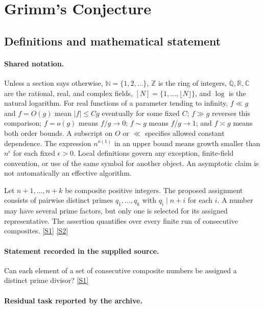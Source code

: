 \documentclass[11pt,a4paper]{article}
\newcommand{\N}{\mathbb{N}}
\newcommand{\Z}{\mathbb{Z}}
\newcommand{\Q}{\mathbb{Q}}
\newcommand{\R}{\mathbb{R}}
\newcommand{\C}{\mathbb{C}}
\newcommand{\sref}[2]{\hyperlink{source:#1:#2}{[S#2]}}
\begin{document}
\section{Grimm's Conjecture}\label{statement}


\subsection{Definitions and mathematical statement}

\paragraph{Shared notation.}Unless a section says otherwise, $\N=\{1,2,\ldots\}$,
$\Z$ is the ring of integers, $\Q,\R,\C$ are the rational, real, and complex
fields, $[N]=\{1,\ldots,\lfloor N\rfloor\}$, and $\log$ is the natural
logarithm. For real functions of a parameter tending to infinity,
$f\ll g$ and $f=O(g)$ mean $|f|\leq Cg$ eventually for some fixed $C$;
$f\gg g$ reverses this comparison; $f=o(g)$ means $f/g\to0$;
$f\sim g$ means $f/g\to1$; and $f\asymp g$ means both order bounds.
A subscript on $O$ or $\ll$ specifies allowed constant dependence.
The expression $n^{o(1)}$ in an upper bound means growth smaller than
$n^\epsilon$ for each fixed $\epsilon>0$. Local definitions govern any
exception, finite-field convention, or use of the same symbol for another
object. An asymptotic claim is not automatically an effective algorithm.



Let $n+1,\ldots,n+k$ be composite positive integers. The proposed assignment consists of pairwise distinct primes $q_1,\ldots,q_k$ with $q_i\mid n+i$ for each $i$. A number may have several prime factors, but only one is selected for its assigned representative. The assertion quantifies over every finite run of consecutive composites. \sref{statement}{1} \sref{statement}{2}

\paragraph{Statement recorded in the supplied source.}
Can each element of a set of consecutive composite numbers be assigned a distinct prime divisor? \sref{statement}{1}

\paragraph{Residual task reported by the archive.}
\end{document}
